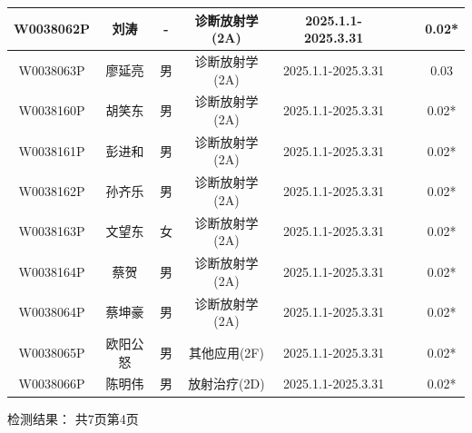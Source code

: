 \begin{table}[H]
\begin{tabular}{|c|c|c|c|c|c|c|c|}
\hline
W0038062P & 刘涛 & - & 诊断放射学(2A) & 2025.1.1-2025.3.31 &  &  & 0.02* \\
\hline
W0038063P & 廖延亮 & 男 & 诊断放射学(2A) & 2025.1.1-2025.3.31 &  &  & 0.03 \\
\hline
W0038160P & 胡笑东 & 男 & 诊断放射学(2A) & 2025.1.1-2025.3.31 &  &  & 0.02* \\
\hline
W0038161P & 彭进和 & 男 & 诊断放射学(2A) & 2025.1.1-2025.3.31 &  &  & 0.02* \\
\hline
W0038162P & 孙齐乐 & 男 & 诊断放射学(2A) & 2025.1.1-2025.3.31 &  &  & 0.02* \\
\hline
W0038163P & 文望东 & 女 & 诊断放射学(2A) & 2025.1.1-2025.3.31 &  &  & 0.02* \\
\hline
W0038164P & 蔡贺 & 男 & 诊断放射学(2A) & 2025.1.1-2025.3.31 &  &  & 0.02* \\
\hline
W0038064P & 蔡坤豪 & 男 & 诊断放射学(2A) & 2025.1.1-2025.3.31 &  &  & 0.02* \\
\hline
W0038065P & 欧阳公怒 & 男 & 其他应用(2F) & 2025.1.1-2025.3.31 &  &  & 0.02* \\
\hline
W0038066P & 陈明伟 & 男 & 放射治疗(2D) & 2025.1.1-2025.3.31 &  &  & 0.02* \\
\hline
\end{tabular}
\end{table}


检测结果：
共7页第4页

